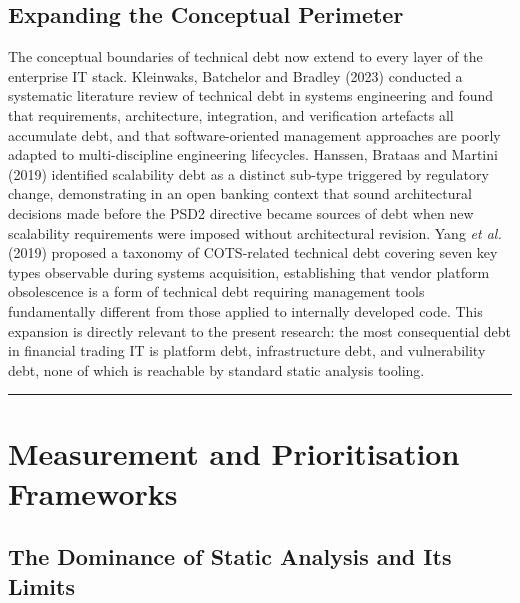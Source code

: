 \documentclass[
  british,
  12pt,
  a4paper,
]{report}
\begin{document}
\subsection{Expanding the Conceptual
Perimeter}\label{expanding-the-conceptual-perimeter}

The conceptual boundaries of technical debt now extend to every layer of
the enterprise IT stack. Kleinwaks, Batchelor and Bradley (2023)
conducted a systematic literature review of technical debt in systems
engineering and found that requirements, architecture, integration, and
verification artefacts all accumulate debt, and that software-oriented
management approaches are poorly adapted to multi-discipline engineering
lifecycles. Hanssen, Brataas and Martini (2019) identified scalability
debt as a distinct sub-type triggered by regulatory change,
demonstrating in an open banking context that sound architectural
decisions made before the PSD2 directive became sources of debt when new
scalability requirements were imposed without architectural revision.
Yang \emph{et al.} (2019) proposed a taxonomy of COTS-related technical
debt covering seven key types observable during systems acquisition,
establishing that vendor platform obsolescence is a form of technical
debt requiring management tools fundamentally different from those
applied to internally developed code. This expansion is directly
relevant to the present research: the most consequential debt in
financial trading IT is platform debt, infrastructure debt, and
vulnerability debt, none of which is reachable by standard static
analysis tooling.

\begin{center}\rule{0.5\linewidth}{0.5pt}\end{center}

\section{Measurement and Prioritisation
Frameworks}\label{measurement-and-prioritisation-frameworks}

\subsection{The Dominance of Static Analysis and Its
Limits}\label{the-dominance-of-static-analysis-and-its-limits}
\end{document}
